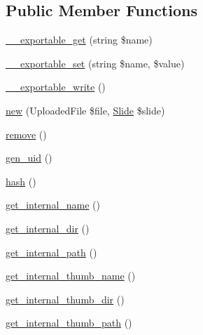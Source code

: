 \subsection*{Public Member Functions}
\begin{DoxyCompactItemize}
\item 
\hyperlink{classlibresignage_1_1common_1_1php_1_1slide_1_1SlideAsset_a6958ef41826cf6f250206cf07b3051d0}{\+\_\+\+\_\+exportable\+\_\+get} (string \$name)
\item 
\hyperlink{classlibresignage_1_1common_1_1php_1_1slide_1_1SlideAsset_ad937ff4d594cefc37e9e982a66c1b8b6}{\+\_\+\+\_\+exportable\+\_\+set} (string \$name, \$value)
\item 
\hyperlink{classlibresignage_1_1common_1_1php_1_1slide_1_1SlideAsset_a3c40d7fc16008b91fcd3ff7b9ed7a6ce}{\+\_\+\+\_\+exportable\+\_\+write} ()
\item 
\hyperlink{classlibresignage_1_1common_1_1php_1_1slide_1_1SlideAsset_a8adbbe02cacb64e1556745b902dcb1c6}{new} (Uploaded\+File \$file, \hyperlink{classlibresignage_1_1common_1_1php_1_1slide_1_1Slide}{Slide} \$slide)
\item 
\hyperlink{classlibresignage_1_1common_1_1php_1_1slide_1_1SlideAsset_adf4f280c1dcca70f0c9c7e223c13a7ce}{remove} ()
\item 
\hyperlink{classlibresignage_1_1common_1_1php_1_1slide_1_1SlideAsset_a39be23fb06691455692a9afbb5c451ae}{gen\+\_\+uid} ()
\item 
\hyperlink{classlibresignage_1_1common_1_1php_1_1slide_1_1SlideAsset_a89db827dd2aa25281c5d56ca468d7bbc}{hash} ()
\item 
\hyperlink{classlibresignage_1_1common_1_1php_1_1slide_1_1SlideAsset_a67daed9b006de11a1cf1436dc16fcd6c}{get\+\_\+internal\+\_\+name} ()
\item 
\hyperlink{classlibresignage_1_1common_1_1php_1_1slide_1_1SlideAsset_ad0f7cc62a7709c3c88d6460b08475a39}{get\+\_\+internal\+\_\+dir} ()
\item 
\hyperlink{classlibresignage_1_1common_1_1php_1_1slide_1_1SlideAsset_a8da7f124edf0e976b46bde45b68ff2e8}{get\+\_\+internal\+\_\+path} ()
\item 
\hyperlink{classlibresignage_1_1common_1_1php_1_1slide_1_1SlideAsset_ab9cc7dd54f03f9f394a98a1cac870fdd}{get\+\_\+internal\+\_\+thumb\+\_\+name} ()
\item 
\hyperlink{classlibresignage_1_1common_1_1php_1_1slide_1_1SlideAsset_a465c0de457e85a60a313811afbe4ac01}{get\+\_\+internal\+\_\+thumb\+\_\+dir} ()
\item 
\hyperlink{classlibresignage_1_1common_1_1php_1_1slide_1_1SlideAsset_a65eaa77a985e56f88745043c2e83b721}{get\+\_\+internal\+\_\+thumb\+\_\+path} ()

\end{DoxyCompactItemize}
